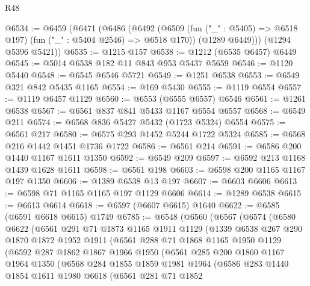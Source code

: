 \begin{lexlean}{R48}
\begin{coremodule}
@6534 := @6459
    (@6471
      (@6486
        (@6492
          (@6509 (fun ("_" : @5405) => @6518 @197) (fun ("_" : @5404 @2546) => @6518 @170))
          (@1289 @6449)))
      (@1294 @5396 @5421))
@6535 := @1215 @157
@6538 := @1212 (@6535 @6457) @6449
@6545 := @5014 @6538 @182 @11 @843 @953 @5437 @5659
@6546 := @1120 @5440
@6548 := @6545 @6546 @5721
@6549 := @1251 @6538
@6553 := @6549 @321 @842 @5435 @1165
@6554 := @169 @5430
@6555 := @1119 @6554
@6557 := @1119 @6457 @1129
@6560 := @6553 (@6555 @6557) @6546
@6561 := @1261 @6538
@6567 := @6561 @837 @841 @5433 @1167 @6554 @6557
@6568 := @6549 @211
@6574 := @6568 @836 @5427 @5432 (@1723 @5324) @6554
@6575 := @6561 @217
@6580 := @6575 @293 @1452 @5244 @1722 @5324
@6585 := @6568 @216 @1442 @1451 @1736 @1722
@6586 := @6561 @214
@6591 := @6586 @200 @1440 @1167 @1611 @1350
@6592 := @6549 @209
@6597 := @6592 @213 @1168 @1439 @1628 @1611
@6598 := @6561 @198
@6603 := @6598 @200 @1165 @1167 @197 @1350
@6606 := @1389 @6538 @13 @197
@6607 := @6603 @6606
@6613 := @6598 @71 @1165 @1165 @197 @1129 @6606
@6614 := @1289 @6538
@6615 := @6613 @6614
@6618 := @6597 (@6607 @6615) @1640
@6622 := @6585 (@6591 @6618 @6615) @1749
@6785 := @6548
    (@6560
      (@6567
        (@6574
          (@6580
            @6622
            (@6561
              @291
              @71
              @1873
              @1165
              @1911
              @1129
              (@1339
                @6538
                @267
                @290
                @1870
                @1872
                @1952
                @1911
                (@6561
                  @288
                  @71
                  @1868
                  @1165
                  @1950
                  @1129
                  (@6592
                    @287
                    @1862
                    @1867
                    @1966
                    @1950
                    (@6561
                      @285
                      @200
                      @1860
                      @1167
                      @1964
                      @1350
                      (@6568
                        @284
                        @1855
                        @1859
                        @1981
                        @1964
                        (@6586
                          @283
                          @1440
                          @1854
                          @1611
                          @1980
                          @6618
                          (@6561
                            @281
                            @71
                            @1852

\end{coremodule}
\end{lexlean}
